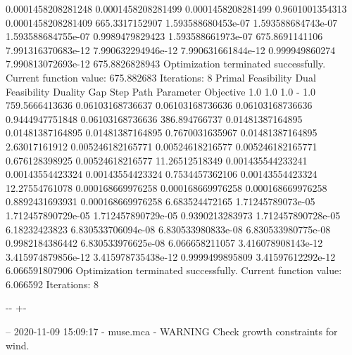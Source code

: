 \documentclass[letterpaper,10pt,english]{sphinxmanual}
\newlength\nbsphinxcodecellspacing
\begin{document}
{\begin{sphinxVerbatim}[commandchars=\\\{\}]
0.0001458208281248  0.0001458208281499  0.0001458208281499  0.9601001354313  0.0001458208281409  665.3317152907
1.593588680453e-07  1.593588684743e-07  1.593588684755e-07  0.9989479829423  1.593588661973e-07  675.8691141106
7.991316370683e-12  7.990632294946e-12  7.990631661844e-12  0.999949860274   7.990813072693e-12  675.8826828943
Optimization terminated successfully.
         Current function value: 675.882683
         Iterations: 8
Primal Feasibility  Dual Feasibility    Duality Gap         Step             Path Parameter      Objective
1.0                 1.0                 1.0                 -                1.0                 759.5666413636
0.06103168736637    0.06103168736636    0.06103168736636    0.9444947751848  0.06103168736636    386.894766737
0.01481387164895    0.01481387164895    0.01481387164895    0.7670031635967  0.01481387164895    2.63017161912
0.005246182165771   0.00524618216577    0.005246182165771   0.676128398925   0.00524618216577    11.26512518349
0.001435544233241   0.00143554423324    0.00143554423324    0.7534457362106  0.00143554423324    12.27554761078
0.000168669976258   0.000168669976258   0.000168669976258   0.8892431693931  0.000168669976258   6.683524472165
1.71245789073e-05   1.712457890729e-05  1.712457890729e-05  0.9390213283973  1.712457890728e-05  6.18232423823
6.830533706094e-08  6.830533980833e-08  6.830533980775e-08  0.9982184386442  6.830533976625e-08  6.066658211057
3.416078908143e-12  3.415974879856e-12  3.415978735438e-12  0.9999499895809  3.41597612292e-12   6.066591807906
Optimization terminated successfully.
         Current function value: 6.066592
         Iterations: 8
\end{sphinxVerbatim}
}

{

\kern-\sphinxverbatimsmallskipamount\kern-\baselineskip
\kern+\FrameHeightAdjust\kern-\fboxrule
\vspace{\nbsphinxcodecellspacing}

\begin{sphinxVerbatim}[commandchars=\\\{\}]
-- 2020-11-09 15:09:17 - muse.mca - WARNING
Check growth constraints for wind.

\end{sphinxVerbatim}
}
\end{document}
